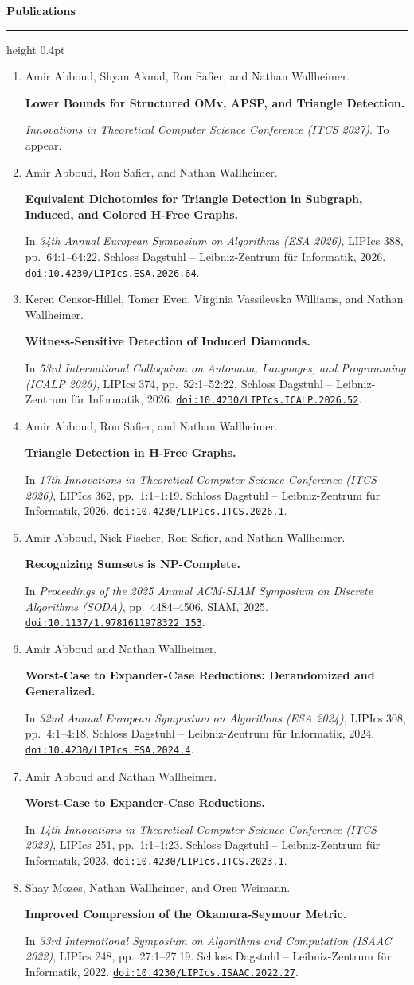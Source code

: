 \documentclass[11pt,a4paper]{article}
\newcommand{\cvsection}[1]{%
  \par\addvspace{1.1\baselineskip}\Needspace{4\baselineskip}%
  {\large\bfseries #1\par}\nobreak\vspace{3pt}%
  {\color{gray}\hrule height 0.4pt}\nobreak\vspace{6pt}}
\newcommand{\doi}[1]{\mbox{\href{https://doi.org/#1}{\nolinkurl{doi:#1}}}}
\newcommand{\publication}[3]{%
  \item \begin{minipage}[t]{\linewidth}
    \RaggedRight #2\par\vspace{1pt}
    \textbf{#1}\par\vspace{1pt}
    {\small #3\par}
  \end{minipage}}
\begin{document}
\newpage
\cvsection{Publications}
\begin{enumerate}[leftmargin=*,itemsep=0.65\baselineskip,parsep=0pt,topsep=0pt]
  \publication{Lower Bounds for Structured OMv, APSP, and Triangle Detection.}
    {Amir Abboud, Shyan Akmal, Ron Safier, and Nathan Wallheimer.}
    {\emph{Innovations in Theoretical Computer Science Conference (ITCS 2027)}.
    To appear.}

  \publication{Equivalent Dichotomies for Triangle Detection in Subgraph, Induced,
    and Colored H-Free Graphs.}
    {Amir Abboud, Ron Safier, and Nathan Wallheimer.}
    {In \emph{34th Annual European Symposium on Algorithms (ESA 2026)},
    LIPIcs 388, pp.\ 64:1--64:22. Schloss Dagstuhl -- Leibniz-Zentrum f\"ur
    Informatik, 2026. \doi{10.4230/LIPIcs.ESA.2026.64}.}

  \publication{Witness-Sensitive Detection of Induced Diamonds.}
    {Keren Censor-Hillel, Tomer Even, Virginia Vassilevska Williams, and Nathan Wallheimer.}
    {In \emph{53rd International Colloquium on Automata, Languages, and
    Programming (ICALP 2026)}, LIPIcs 374, pp.\ 52:1--52:22.
    Schloss Dagstuhl -- Leibniz-Zentrum f\"ur Informatik, 2026.
    \doi{10.4230/LIPIcs.ICALP.2026.52}.}

  \publication{Triangle Detection in H-Free Graphs.}
    {Amir Abboud, Ron Safier, and Nathan Wallheimer.}
    {In \emph{17th Innovations in Theoretical Computer Science Conference
    (ITCS 2026)}, LIPIcs 362, pp.\ 1:1--1:19.
    Schloss Dagstuhl -- Leibniz-Zentrum f\"ur Informatik, 2026.
    \doi{10.4230/LIPIcs.ITCS.2026.1}.}

  \publication{Recognizing Sumsets is NP-Complete.}
    {Amir Abboud, Nick Fischer, Ron Safier, and Nathan Wallheimer.}
    {In \emph{Proceedings of the 2025 Annual ACM-SIAM Symposium on Discrete
    Algorithms (SODA)}, pp.\ 4484--4506. SIAM, 2025.
    \doi{10.1137/1.9781611978322.153}.}

  \publication{Worst-Case to Expander-Case Reductions: Derandomized and Generalized.}
    {Amir Abboud and Nathan Wallheimer.}
    {In \emph{32nd Annual European Symposium on Algorithms (ESA 2024)},
    LIPIcs 308, pp.\ 4:1--4:18.
    Schloss Dagstuhl -- Leibniz-Zentrum f\"ur Informatik, 2024.
    \doi{10.4230/LIPIcs.ESA.2024.4}.}

  \publication{Worst-Case to Expander-Case Reductions.}
    {Amir Abboud and Nathan Wallheimer.}
    {In \emph{14th Innovations in Theoretical Computer Science Conference
    (ITCS 2023)}, LIPIcs 251, pp.\ 1:1--1:23.
    Schloss Dagstuhl -- Leibniz-Zentrum f\"ur Informatik, 2023.
    \doi{10.4230/LIPIcs.ITCS.2023.1}.}

  \publication{Improved Compression of the Okamura-Seymour Metric.}
    {Shay Mozes, Nathan Wallheimer, and Oren Weimann.}
    {In \emph{33rd International Symposium on Algorithms and Computation
    (ISAAC 2022)}, LIPIcs 248, pp.\ 27:1--27:19.
    Schloss Dagstuhl -- Leibniz-Zentrum f\"ur Informatik, 2022.
    \doi{10.4230/LIPIcs.ISAAC.2022.27}.}
\end{enumerate}
\end{document}

